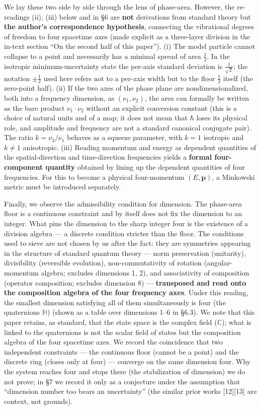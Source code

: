 \documentclass[
]{article}
\begin{document}
We lay these two side by side through the lens of phase-area. However,
the re-readings (ii), (iii) below and in §6 are \textbf{not} derivations
from standard theory but \textbf{the author's correspondence
hypothesis}, connecting the vibrational degrees of freedom to four
spacetime axes (made explicit as a three-layer division in the in-text
section ``On the second half of this paper''). (i) The model particle
cannot collapse to a point and necessarily has a minimal spread of area
\(\tfrac12\). In the isotropic minimum-uncertainty state the per-axis
standard deviation is \(\tfrac{1}{\sqrt2}\); the notation
\(\pm\tfrac12\) used here refers not to a per-axis width but to the
floor \(\tfrac12\) itself (the zero-point half). (ii) If the two axes of
the phase plane are nondimensionalized, both into a frequency dimension,
as \((\nu_1,\nu_2)\), the area can formally be written as the bare
product \(\nu_1\cdot\nu_2\) without an explicit conversion constant
(this is a choice of natural units and of a map; it does not mean that
\(\hbar\) loses its physical role, and amplitude and frequency are not a
standard canonical conjugate pair). The ratio \(k=\nu_2/\nu_1\) behaves
as a squeeze parameter, with \(k=1\) isotropic and \(k\neq1\)
anisotropic. (iii) Reading momentum and energy as dependent quantities
of the spatial-direction and time-direction frequencies yields a
\textbf{formal four-component quantity} obtained by lining up the
dependent quantities of four frequencies. For this to become a physical
four-momentum \((E,\boldsymbol{p})\), a Minkowski metric must be
introduced separately.

Finally, we observe the admissibility condition for dimension. The
phase-area floor is a continuous constraint and by itself does not fix
the dimension to an integer. What pins the dimension to the sharp
integer four is the existence of a division algebra --- a discrete
condition stricter than the floor. The conditions used to sieve are not
chosen by us after the fact: they are symmetries appearing in the
structure of standard quantum theory --- norm preservation (unitarity),
divisibility (reversible evolution), non-commutativity of rotation
(angular-momentum algebra; excludes dimensions 1, 2), and associativity
of composition (operator composition; excludes dimension 8) ---
\textbf{transposed and read onto the composition algebra of the four
frequency axes}. Under this reading, the smallest dimension satisfying
all of them simultaneously is four (the quaternions \(\mathbb{H}\))
(shown as a table over dimensions 1--6 in §6.3). We note that this paper
retains, as standard, that the state space is the complex field
(\(\mathbb{C}\)); what is linked to the quaternions is not the scalar
field of states but the composition algebra of the four spacetime axes.
We record the coincidence that two independent constraints --- the
continuous floor (cannot be a point) and the discrete ring (closes only
at four) --- converge on the same dimension four. Why the system reaches
four and stops there (the stabilization of dimension) we do not prove;
in §7 we record it only as a conjecture under the assumption that
``dimension number too bears an uncertainty'' (the similar prior works
{[}12{]}{[}13{]} are context, not grounds).
\end{document}
